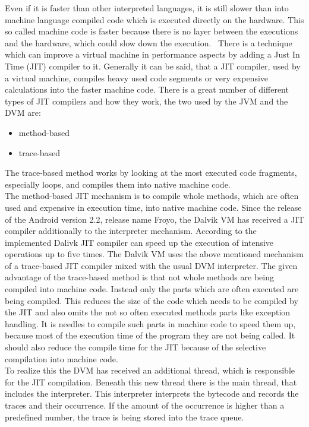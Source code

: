 Even if it is faster than other interpreted languages, it is still slower than into machine language compiled code which is executed directly on the hardware.
This so called machine code is faster because there is no layer between the executions and the hardware, which could slow down the execution.~\cite{aycock2003brief}
There is a technique which can improve a virtual machine in performance aspects by adding a Just In Time (JIT) compiler to it.
Generally it can be said, that a JIT compiler, used by a virtual machine, compiles heavy used code segments or very expensive calculations into the faster machine code.
There is a great number of different types of JIT compilers and how they work, the two used by the JVM and the DVM are:
\begin{itemize}
\item method-based
\item trace-based
\end{itemize}
The trace-based method works by looking at the most executed code fragments, especially loops, and compiles them into native machine code.\\
The method-based JIT mechanism is to compile whole methods, which are often used and expensive in execution time, into native machine code.
Since the release of the Android version 2.2, release name Froyo, the Dalvik VM has received a JIT compiler additionally to the interpreter mechanism.
According to \cite{cheng2010jit} the implemented Dalivk JIT compiler can speed up the execution of intensive operations up to five times.
The Dalvik VM uses the above mentioned mechanism of a trace-based JIT compiler mixed with the usual DVM interpreter.
The given advantage of the trace-based method is that not whole methods are being compiled into machine code.
Instead only the parts which are often executed are being compiled.
This reduces the size of the code which needs to be compiled by the JIT and also omits the not so often executed methods parts like exception handling.
It is needles to compile such parts in machine code to speed them up, because most of the execution time of the program they are not being called.
It should also reduce the compile time for the JIT because of the selective compilation into machine code.\\
To realize this the DVM has received an additional thread, which is responsible for the JIT compilation.
Beneath this new thread there is the main thread, that includes the interpreter.
This interpreter interprets the bytecode and records the traces and their occurrence.
If the amount of the occurrence is higher than a predefined number, the trace is being stored into the trace queue.
